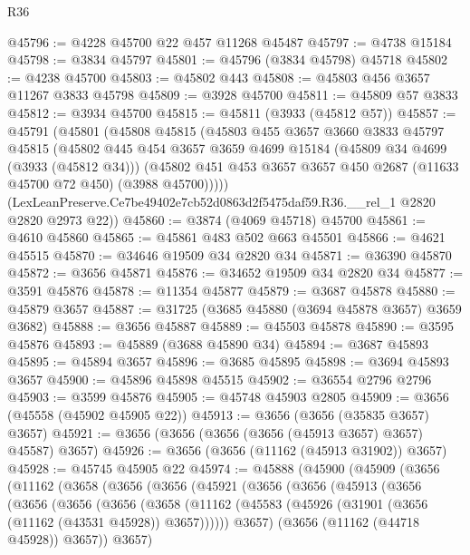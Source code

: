 \begin{lexlean}{R36}
\begin{coremodule}
@45796 := @4228 @45700 @22 @457 @11268 @45487
@45797 := @4738 @15184
@45798 := @3834 @45797
@45801 := @45796 (@3834 @45798) @45718
@45802 := @4238 @45700
@45803 := @45802 @443
@45808 := @45803 @456 @3657 @11267 @3833 @45798
@45809 := @3928 @45700
@45811 := @45809 @57 @3833
@45812 := @3934 @45700
@45815 := @45811 (@3933 (@45812 @57))
@45857 := @45791
    (@45801
      (@45808
        @45815
        (@45803
          @455
          @3657
          @3660
          @3833
          @45797
          @45815
          (@45802
            @445
            @454
            @3657
            @3659
            @4699
            @15184
            (@45809 @34 @4699 (@3933 (@45812 @34)))
            (@45802 @451 @453 @3657 @3657 @450 @2687 (@11633 @45700 @72 @450) (@3988 @45700)))))
      (LexLeanPreserve.Ce7be49402e7cb52d0863d2f5475daf59.R36.__rel_1 @2820 @2820 @2973 @22))
@45860 := @3874 (@4069 @45718) @45700
@45861 := @4610 @45860
@45865 := @45861 @483 @502 @663 @45501
@45866 := @4621 @45515
@45870 := @34646 @19509 @34 @2820 @34
@45871 := @36390 @45870
@45872 := @3656 @45871
@45876 := @34652 @19509 @34 @2820 @34
@45877 := @3591 @45876
@45878 := @11354 @45877
@45879 := @3687 @45878
@45880 := @45879 @3657
@45887 := @31725 (@3685 @45880 (@3694 @45878 @3657) @3659 @3682)
@45888 := @3656 @45887
@45889 := @45503 @45878
@45890 := @3595 @45876
@45893 := @45889 (@3688 @45890 @34)
@45894 := @3687 @45893
@45895 := @45894 @3657
@45896 := @3685 @45895
@45898 := @3694 @45893 @3657
@45900 := @45896 @45898 @45515
@45902 := @36554 @2796 @2796
@45903 := @3599 @45876
@45905 := @45748 @45903 @2805
@45909 := @3656 (@45558 (@45902 @45905 @22))
@45913 := @3656 (@3656 (@35835 @3657) @3657)
@45921 := @3656 (@3656 (@3656 (@3656 (@45913 @3657) @3657) @45587) @3657)
@45926 := @3656 (@3656 (@11162 (@45913 @31902)) @3657)
@45928 := @45745 @45905 @22
@45974 := @45888
    (@45900
      (@45909
        (@3656
          (@11162
            (@3658
              (@3656
                (@3656
                  (@45921
                    (@3656
                      (@3656
                        (@45913
                          (@3656
                            (@3656
                              (@3656
                                (@3656
                                  (@3658
                                    (@11162
                                      (@45583
                                        (@45926 (@31901 (@3656 (@11162 (@43531 @45928)) @3657))))))
                                  @3657)
                                (@3656 (@11162 (@44718 @45928)) @3657))
                              @3657)

\end{coremodule}
\end{lexlean}
